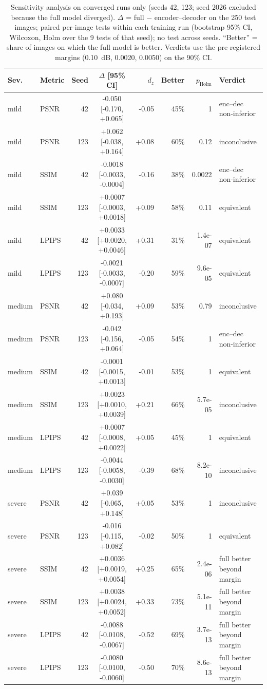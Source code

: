 \begin{table}[t]
\centering
\caption{Sensitivity analysis on converged runs only (seeds 42, 123; seed 2026 excluded because the full model diverged). $\Delta$ = full $-$ encoder--decoder on the 250 test images; paired per-image tests within each training run (bootstrap 95\% CI, Wilcoxon, Holm over the 9 tests of that seed); no test across seeds. ``Better'' = share of images on which the full model is better. Verdicts use the pre-registered margins (0.10~dB, 0.0020, 0.0050) on the 90\% CI.}
\label{tab:converged}
\scriptsize
\setlength{\tabcolsep}{2.5pt}
\begin{tabular}{llrcrrrl}
\toprule
Sev. & Metric & Seed & $\Delta$ [95\% CI] & $d_z$ & Better & $p_\mathrm{Holm}$ & Verdict \\
\midrule
mild & PSNR & 42 & -0.050 [-0.170, +0.065] & -0.05 & 45\% & 1 & enc--dec non-inferior \\
mild & PSNR & 123 & +0.062 [-0.038, +0.164] & +0.08 & 60\% & 0.12 & inconclusive \\
mild & SSIM & 42 & -0.0018 [-0.0033, -0.0004] & -0.16 & 38\% & 0.0022 & enc--dec non-inferior \\
mild & SSIM & 123 & +0.0007 [-0.0003, +0.0018] & +0.09 & 58\% & 0.11 & equivalent \\
mild & LPIPS & 42 & +0.0033 [+0.0020, +0.0046] & +0.31 & 31\% & 1.4e-07 & equivalent \\
mild & LPIPS & 123 & -0.0021 [-0.0033, -0.0007] & -0.20 & 59\% & 9.6e-05 & equivalent \\
\midrule
medium & PSNR & 42 & +0.080 [-0.034, +0.193] & +0.09 & 53\% & 0.79 & inconclusive \\
medium & PSNR & 123 & -0.042 [-0.156, +0.064] & -0.05 & 54\% & 1 & enc--dec non-inferior \\
medium & SSIM & 42 & -0.0001 [-0.0015, +0.0013] & -0.01 & 53\% & 1 & equivalent \\
medium & SSIM & 123 & +0.0023 [+0.0010, +0.0039] & +0.21 & 66\% & 5.7e-05 & inconclusive \\
medium & LPIPS & 42 & +0.0007 [-0.0008, +0.0022] & +0.05 & 45\% & 1 & equivalent \\
medium & LPIPS & 123 & -0.0044 [-0.0058, -0.0030] & -0.39 & 68\% & 8.2e-10 & inconclusive \\
\midrule
severe & PSNR & 42 & +0.039 [-0.065, +0.148] & +0.05 & 53\% & 1 & inconclusive \\
severe & PSNR & 123 & -0.016 [-0.115, +0.082] & -0.02 & 50\% & 1 & equivalent \\
severe & SSIM & 42 & +0.0036 [+0.0019, +0.0054] & +0.25 & 65\% & 2.4e-06 & full better beyond margin \\
severe & SSIM & 123 & +0.0038 [+0.0024, +0.0052] & +0.33 & 73\% & 5.1e-11 & full better beyond margin \\
severe & LPIPS & 42 & -0.0088 [-0.0108, -0.0067] & -0.52 & 69\% & 3.7e-13 & full better beyond margin \\
severe & LPIPS & 123 & -0.0080 [-0.0100, -0.0060] & -0.50 & 70\% & 8.6e-13 & full better beyond margin \\
\bottomrule
\end{tabular}
\end{table}
